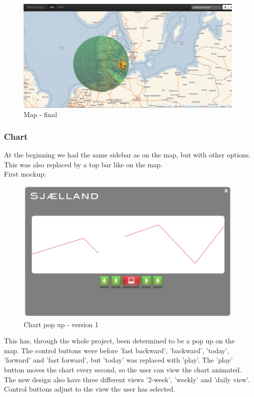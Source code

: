 \begin{figure}[htbp]
   \centering
   \includegraphics[width=1\linewidth]{figure/design_map_final.eps}
   \caption{Map - final}
\end{figure}

\subsubsection{Chart}
At the beginning we had the same sidebar as on the map, but with other options. This was also replaced by a top bar like on the map.\\
First mockup: 
\begin{figure}[htbp]
   \centering
   \includegraphics[width=1\linewidth]{figure/design_chart_v1.eps}
   \caption{Chart pop up - version 1}
\end{figure}

This has, through the whole project, been determined to be a pop up on the map.
The control buttons were before 'fast backward', 'backward', 'today', 'forward' and 'fast forward', but 'today' was replaced with 'play'. The 'play' button moves the chart every second, so the user can view the chart animated.\\
The new design also have three different views '2-week', 'weekly' and 'daily view'. Control buttons adjust to the view the user has selected.

